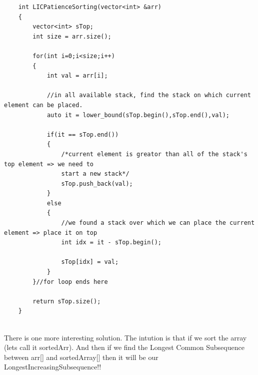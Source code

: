 \begin{solution}
{      }

    \begin{verbatim}
    int LICPatienceSorting(vector<int> &arr)
    {
        vector<int> sTop; 
        int size = arr.size();
        
        for(int i=0;i<size;i++)
        {
            int val = arr[i];
            
            //in all available stack, find the stack on which current element can be placed. 
            auto it = lower_bound(sTop.begin(),sTop.end(),val); 

            if(it == sTop.end())
            {
                /*current element is greator than all of the stack's top element => we need to 
                start a new stack*/
                sTop.push_back(val);
            }
            else
            {
                //we found a stack over which we can place the current element => place it on top
                int idx = it - sTop.begin();
            
                sTop[idx] = val; 
            }
        }//for loop ends here
        
        return sTop.size();
    }
    
    \end{verbatim}
\end{solution}

\begin{solution}
    There is one more interesting solution.
    The intution is that if we sort the array (lets call it sortedArr). And then if we find the Longest Common Subsequence
    between arr[] and sortedArray[] then it will be our LongestIncreasingSubsequence!!
\end{solution}


